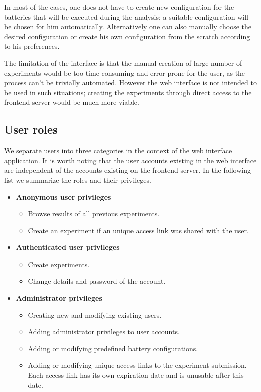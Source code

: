 \documentclass[
  digital,  	%
  color,		%
  oneside,   	%
  12pt,
  nocover,
  notable,
  nolof,
  nolot,
]{fithesis3}
\begin{document}
In most of the cases, one does not have to create new configuration for the batteries that will be executed during the analysis; a suitable configuration will be chosen for him automatically. Alternatively one can also manually choose the desired configuration or create his own configuration from the scratch according to his preferences.

The limitation of the interface is that the manual creation of large number of experiments would be too time-consuming and error-prone for the user, as the process can't be trivially automated. However the web interface is not intended to be used in such situations; creating the experiments through direct access to the frontend server would be much more viable. 

\subsection*{User roles}
We separate users into three categories in the context of the web interface application. It is worth noting that the user accounts existing in the web interface are independent of the accounts existing on the frontend server. In the following list we summarize the roles and their privileges.

\begin{itemize}
\item \textbf{Anonymous user privileges}
\begin{itemize}
\item Browse results of all previous experiments.
\item Create an experiment if an unique access link was shared with the user.
\end{itemize}
\item \textbf{Authenticated user privileges}
\begin{itemize}
\item Create experiments.
\item Change details and password of the account.
\end{itemize}
\item \textbf{Administrator privileges}
\begin{itemize}
\item Creating new and modifying existing users.
\item Adding administrator privileges to user accounts.
\item Adding or modifying predefined battery configurations.
\item Adding or modifying unique access links to the experiment submission. Each access link has its own expiration date and is unusable after this date.
\end{itemize}
\end{itemize}
\end{document}
